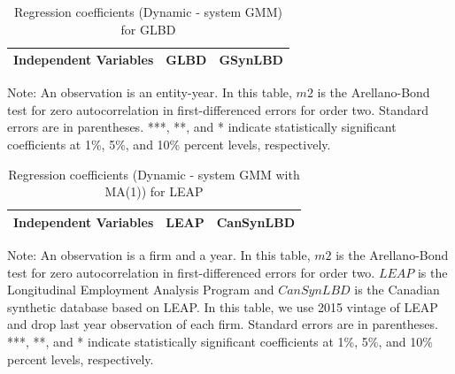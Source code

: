 \begin{table}[H]
  \centering
 \caption{Regression coefficients (Dynamic - system GMM) for GLBD} \label{tab:Dynamic - system GMM_ger} \medskip
\renewcommand{\arraystretch}{1}
\setlength{\tabcolsep}{14pt}
\begin{tabular}{l|c| c}
\toprule
\textbf{Independent Variables}&\textbf{GLBD} &\textbf{GSynLBD}\\
\midrule

   \bottomrule
  \end{tabular} 
\begin{tablenotes}
\small
\item Note: An observation is an entity-year. In this table, $m2$ is the Arellano-Bond test for zero autocorrelation in first-differenced errors for order two. Standard errors are in parentheses. ***, **, and * indicate statistically significant coefficients at 1\%, 5\%, and 10\% percent levels, respectively.
 \end{tablenotes}
\end{table}









\begin{table}[H]
  \centering
\begin{threeparttable}
 \caption{Regression coefficients (Dynamic - system GMM with MA(1)) for LEAP} \label{tab:Dynamic - system GMM with MA(1)_can} \medskip
\renewcommand{\arraystretch}{1}
\begin{tabular}{l|c c| c c}
\toprule
\textbf{Independent Variables}&\multicolumn{2}{c|}{\textbf{LEAP}} &  \multicolumn{2}{c}{\textbf{CanSynLBD}}\\
\midrule

   \bottomrule
  \end{tabular} 
\begin{tablenotes}
\small
\item Note: An observation is a firm and a year. In this table, $m2$ is the Arellano-Bond test for zero autocorrelation in first-differenced errors for order two. $LEAP$ is the Longitudinal Employment Analysis Program and $CanSynLBD$ is the Canadian synthetic database based on LEAP. In this table, we use 2015 vintage of LEAP and drop last year observation of each firm. Standard errors are in parentheses. ***, **, and * indicate statistically significant coefficients at 1\%, 5\%, and 10\% percent levels, respectively.
 \end{tablenotes}
 \end{threeparttable}
\end{table}

